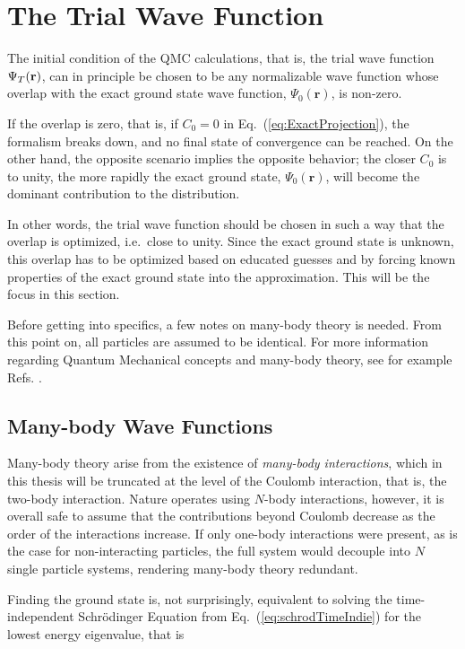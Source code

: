\section{The Trial Wave Function}
\label{sec:trialWF}

The initial condition of the QMC calculations, that is, the trial wave function $\Psi_T(\mathbf{r})$, can in principle be chosen to be any normalizable wave function whose overlap with the exact ground state wave function, $\Psi_0(\mathbf{r})$, is non-zero. 

If the overlap is zero, that is, if $C_0=0$ in Eq.~(\ref{eq:ExactProjection}), the formalism breaks down, and no final state of convergence can be reached. On the other hand, the opposite scenario implies the opposite behavior; the closer $C_0$ is to unity, the more rapidly the exact ground state, $\Psi_0(\mathbf{r})$, will become the dominant contribution to the distribution. 

In other words, the trial wave function should be chosen in such a way that the overlap is optimized, i.e.~close to unity. Since the exact ground state is unknown, this overlap has to be optimized based on educated guesses and by forcing known properties of the exact ground state into the approximation. This will be the focus in this section.  

Before getting into specifics, a few notes on many-body theory is needed. From this point on, all particles are assumed to be identical. For more information regarding Quantum Mechanical concepts and many-body theory, see for example Refs. \cite{griffiths, Sakurai:94, Shavitt}. 

\subsection{Many-body Wave Functions}
\label{sec:manyBodyWFs}

Many-body theory arise from the existence of \textit{many-body interactions}, which in this thesis will be truncated at the level of the Coulomb interaction, that is, the two-body interaction. Nature operates using  $N$-body interactions, however, it is overall safe to assume that the contributions beyond Coulomb decrease as the order of the interactions increase. If only one-body interactions were present, as is the case for non-interacting particles, the full system would decouple into $N$ single particle systems, rendering many-body theory redundant.

Finding the ground state is, not surprisingly, equivalent to solving the time-independent Schrödinger Equation from Eq.~(\ref{eq:schrodTimeIndie}) for the lowest energy eigenvalue, that is

